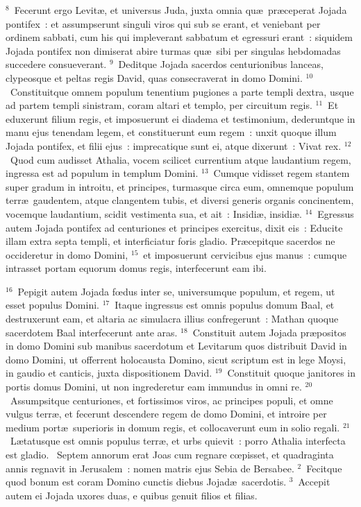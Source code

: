 ${}^{8}$~Fecerunt ergo Levit\ae , et universus Juda, juxta omnia qu\ae\ pr\ae ceperat Jojada pontifex~: et assumpserunt singuli viros qui sub se erant, et veniebant per ordinem sabbati, cum his qui impleverant sabbatum et egressuri erant~: siquidem Jojada pontifex non dimiserat abire turmas qu\ae\ sibi per singulas hebdomadas succedere consueverant.
${}^{9}$~Deditque Jojada sacerdos centurionibus lanceas, clypeosque et peltas regis David, quas consecraverat in domo Domini.
${}^{10}$~Constituitque omnem populum tenentium pugiones a parte templi dextra, usque ad partem templi sinistram, coram altari et templo, per circuitum regis.
${}^{11}$~Et eduxerunt filium regis, et imposuerunt ei diadema et testimonium, dederuntque in manu ejus tenendam legem, et constituerunt eum regem~: unxit quoque illum Jojada pontifex, et filii ejus~: imprecatique sunt ei, atque dixerunt~: Vivat rex.
${}^{12}$~Quod cum audisset Athalia, vocem scilicet currentium atque laudantium regem, ingressa est ad populum in templum Domini.
${}^{13}$~Cumque vidisset regem stantem super gradum in introitu, et principes, turmasque circa eum, omnemque populum terr\ae\ gaudentem, atque clangentem tubis, et diversi generis organis concinentem, vocemque laudantium, scidit vestimenta sua, et ait~: Insidi\ae , insidi\ae .
${}^{14}$~Egressus autem Jojada pontifex ad centuriones et principes exercitus, dixit eis~: Educite illam extra septa templi, et interficiatur foris gladio. Pr\ae cepitque sacerdos ne occideretur in domo Domini,
${}^{15}$~et imposuerunt cervicibus ejus manus~: cumque intrasset portam equorum domus regis, interfecerunt eam ibi.


${}^{16}$~Pepigit autem Jojada fœdus inter se, universumque populum, et regem, ut esset populus Domini.
${}^{17}$~Itaque ingressus est omnis populus domum Baal, et destruxerunt eam, et altaria ac simulacra illius confregerunt~: Mathan quoque sacerdotem Baal interfecerunt ante aras.
${}^{18}$~Constituit autem Jojada pr\ae positos in domo Domini sub manibus sacerdotum et Levitarum quos distribuit David in domo Domini, ut offerrent holocausta Domino, sicut scriptum est in lege Moysi, in gaudio et canticis, juxta dispositionem David.
${}^{19}$~Constituit quoque janitores in portis domus Domini, ut non ingrederetur eam immundus in omni re.
${}^{20}$~Assumpsitque centuriones, et fortissimos viros, ac principes populi, et omne vulgus terr\ae , et fecerunt descendere regem de domo Domini, et introire per medium port\ae\ superioris in domum regis, et collocaverunt eum in solio regali.
${}^{21}$~L\ae tatusque est omnis populus terr\ae , et urbs quievit~: porro Athalia interfecta est gladio.
~\lettrine[lines=10,image=true,loversize=0.05,lraise=-0.03]{S}{}eptem annorum erat Joas cum regnare cœpisset, et quadraginta annis regnavit in Jerusalem~: nomen matris ejus Sebia de Bersabee.
${}^{2}$~Fecitque quod bonum est coram Domino cunctis diebus Jojad\ae\ sacerdotis.
${}^{3}$~Accepit autem ei Jojada uxores duas, e quibus genuit filios et filias.


